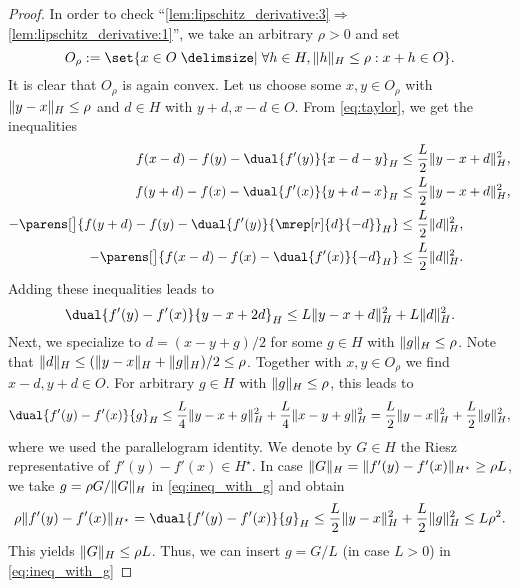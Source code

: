 \documentclass[
	english
]{scrartcl}
\numberwithin{equation}{section} %
\providecommand\given{\nonscript\;\delimsize|\nonscript\;\mathopen{}}
\DeclarePairedDelimiter\norm{\lVert}{\rVert}
\DeclarePairedDelimiter\parens()
\newcommand{\dualspace}{^\star}
\begin{document}
\begin{proof}
	In order to check ``\ref{lem:lipschitz_derivative:3}$\Rightarrow$\ref{lem:lipschitz_derivative:1}'',
	we take an arbitrary $\rho > 0$ and set
	\begin{equation}\label{eq_O_rho}
		O_\rho :=
		\set{
			x \in O
			\given
			\forall h \in H, \norm{h}_H \le \rho : x +  h \in O
		}.
	\end{equation}
	It is clear that $O_\rho$ is again convex.
	Let us choose some $x,y \in O_\rho$
	with $\norm{y - x}_H \le \rho$
	and $d \in H$ with $y+d, x-d \in O$.
	From \eqref{eq:taylor},
	we get the inequalities
	\begin{align*}
		f(x-d) - f(y) - \dual{f'(y)}{x-d-y}_H &\le \frac L2 \norm{y-x+d}_H^2,\\
		f(y+d) - f(x) - \dual{f'(x)}{y+d-x}_H &\le \frac L2 \norm{y-x+d}_H^2,\\
		-\parens[\big]{f(y+d) - f(y) - \dual{f'(y)}{\mrep[r]{d}{-d}}_H} &\le \frac L2 \norm{d}_H^2,\\
		-\parens[\big]{f(x-d) - f(x) - \dual{f'(x)}{-d}_H} &\le \frac L2 \norm{d}_H^2.
	\end{align*}
	Adding these inequalities leads to
	\begin{equation*}
		\dual{f'(y) - f'(x)}{y-x+2 d}_H
		\le
		L \norm{y-x+d}_H^2 + L \norm{d}_H^2.
	\end{equation*}
	Next, we specialize to
	$d = (x - y + g) / 2$ for some $g \in H$ with $\norm{g}_H \le \rho$.
	Note that
	$\norm{d}_H \le (\norm{y-x}_H + \norm{g}_H)/2 \le \rho$.
	Together with $x,y \in O_\rho$ we find
	$x - d, y + d \in O$.
	For arbitrary $g \in H$ with $\norm{g}_H \le \rho$, this leads to
	\begin{equation}
		\label{eq:ineq_with_g}
		\dual{f'(y) - f'(x)}{g}_H
		\le
		\frac L4 \norm{y - x + g}_H^2 + \frac L4 \norm{x - y + g}_H^2
		=
		\frac L2 \norm{y - x}_H^2 + \frac L2 \norm{g}_H^2
		,
	\end{equation}
	where we used the parallelogram identity.
	We denote by $G \in H$ the Riesz representative of $f'(y) - f'(x) \in H\dualspace$.
	In case
	$\norm{G}_H = \norm{f'(y) - f'(x)}_{H\dualspace} \ge \rho L$,
	we take $g = \rho G / \norm{G}_H$
	in \eqref{eq:ineq_with_g}
	and obtain
	\begin{align*}
		\rho \norm{f'(y) - f'(x)}_{H\dualspace}
		=
		\dual{f'(y) - f'(x)}{g}_H
		\le
		\frac L2 \norm{y - x}_H^2 + \frac L2 \norm{g}_H^2
		\le
		L \rho^2
		.
	\end{align*}
	This yields $\norm{G}_H \le \rho L$.
	Thus, we can insert $g = G / L$
	(in case $L > 0$)
	in \eqref{eq:ineq_with_g}

\end{proof}
\end{document}
